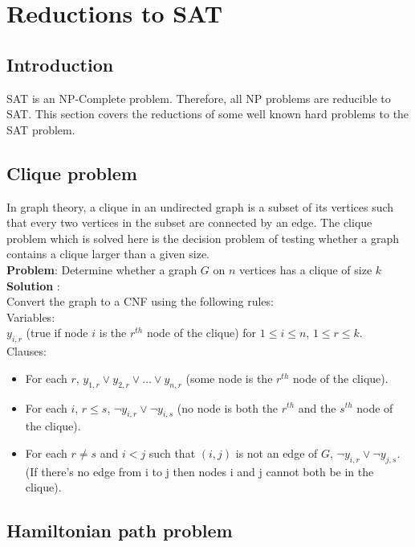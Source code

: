\chapter{Reductions to SAT}


\section{Introduction}
SAT is an NP-Complete problem. Therefore, all NP problems are reducible to SAT. This section covers the reductions of some well known hard problems to the SAT problem.

\section{Clique problem}
In graph theory, a clique in an undirected graph is a subset of its vertices such that every two vertices in the subset are connected by an edge. The clique problem which is solved here is the decision problem of testing whether a graph contains a clique larger than a given size.\\
\noindent \textbf{Problem}: Determine whether a graph $G$ on $n$ vertices has a clique of size $k$\\
\noindent \textbf{Solution} \cite{reduce}:\\
\noindent Convert the graph to a CNF using the following rules:\\
\noindent Variables: \\$y_{i,r}$ (true if node $i$ is the $r^{th}$ node of the clique) for $1 \leq i \leq n$, $1 \leq r \leq k$.\\
\noindent Clauses:
\begin{itemize}
\item For each $r$, $y_{1,r} \vee y_{2,r} \vee \ldots \vee y_{n,r}$ (some node is the $r^{th}$ node of the clique).

\item For each $i$, $r\leq s$, $\neg y_{i,r} \vee \neg y_{i,s}$ (no node is both the $r^{th}$ and the $s^{th}$ node of the clique).

\item For each $r \neq s$ and $i<j$ such that $(i,j)$ is not an edge of $G$, $\neg y_{i,r} \vee \neg y_{j,s}$. (If there's no edge from i to j then nodes i and j cannot both be in the clique).

\end{itemize}

\section{Hamiltonian path problem}

